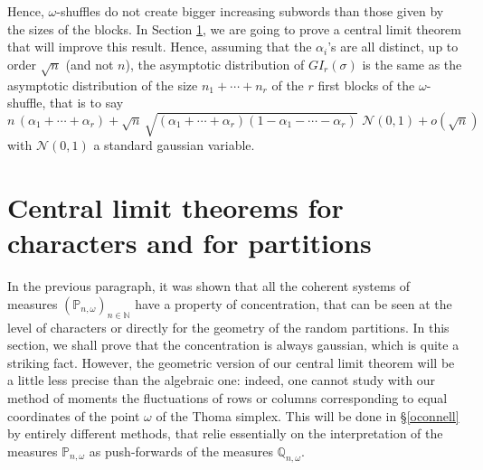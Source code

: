 \documentclass[smallextended,nospthms]{svjour3}
\theoremstyle{remark}
\newcommand{\N}{\mathbb{N}}
\newcommand{\proba}{\mathbb{P}}
\newcommand{\qproba}{\mathbb{Q}}
\begin{document}
Hence, $\omega$-shuffles do not create bigger increasing subwords than those given by the sizes of the blocks. In Section \ref{clt}, we are going to prove a central limit theorem that will improve this result. Hence, assuming that the $\alpha_{i}$'s are all distinct, up to order $\sqrt{n}$ (and not $n$), the asymptotic distribution of $GI_{r}(\sigma)$ is the same as the asymptotic distribution of the size $n_{1}+\cdots+n_{r}$ of the $r$ first blocks of the $\omega$-shuffle, that is to say
$$n\,(\alpha_{1}+\cdots+\alpha_{r})+\sqrt{n}\,\sqrt{(\alpha_{1}+\cdots+\alpha_{r})(1-\alpha_{1}-\cdots-\alpha_{r})}\,\,\mathcal{N}(0,1)+o(\sqrt{n})$$
with $\mathcal{N}(0,1)$ a standard gaussian variable.
\bigskip


\section{Central limit theorems for characters and for partitions}\label{clt}
In the previous paragraph, it was shown that all the coherent systems of measures $(\proba_{n,\omega})_{n \in \N} $ have a property of concentration, that can be seen at the level of characters or directly for the geometry of the random partitions. In this section, we shall prove that the concentration is always gaussian, which is quite a striking fact. However, the geometric version of our central limit theorem will be a little less precise than the algebraic one: indeed, one cannot study with our method of moments the fluctuations of rows or columns corresponding to equal coordinates of the point $\omega$ of the Thoma simplex. This will be done in \S\ref{oconnell} by entirely different methods, that relie essentially on the interpretation of the measures $\proba_{n,\omega}$ as push-forwards of the measures $\qproba_{n,\omega}$.\bigskip
\end{document}
